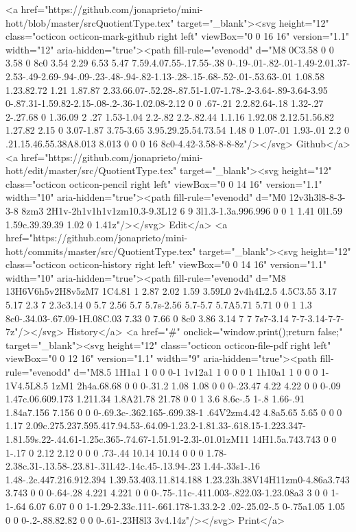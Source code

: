       <a href="https://github.com/jonaprieto/mini-hott/blob/master/srcQuotientType.tex" target="_blank"><svg height="12" class="octicon octicon-mark-github right left" viewBox="0 0 16 16" version="1.1" width="12" aria-hidden="true"><path fill-rule="evenodd" d="M8 0C3.58 0 0 3.58 0 8c0 3.54 2.29 6.53 5.47 7.59.4.07.55-.17.55-.38 0-.19-.01-.82-.01-1.49-2.01.37-2.53-.49-2.69-.94-.09-.23-.48-.94-.82-1.13-.28-.15-.68-.52-.01-.53.63-.01 1.08.58 1.23.82.72 1.21 1.87.87 2.33.66.07-.52.28-.87.51-1.07-1.78-.2-3.64-.89-3.64-3.95 0-.87.31-1.59.82-2.15-.08-.2-.36-1.02.08-2.12 0 0 .67-.21 2.2.82.64-.18 1.32-.27 2-.27.68 0 1.36.09 2 .27 1.53-1.04 2.2-.82 2.2-.82.44 1.1.16 1.92.08 2.12.51.56.82 1.27.82 2.15 0 3.07-1.87 3.75-3.65 3.95.29.25.54.73.54 1.48 0 1.07-.01 1.93-.01 2.2 0 .21.15.46.55.38A8.013 8.013 0 0 0 16 8c0-4.42-3.58-8-8-8z"/></svg> Github</a>
      <a href="https://github.com/jonaprieto/mini-hott/edit/master/src/QuotientType.tex" target="_blank"><svg height="12" class="octicon octicon-pencil right left" viewBox="0 0 14 16" version="1.1" width="10" aria-hidden="true"><path fill-rule="evenodd" d="M0 12v3h3l8-8-3-3-8 8zm3 2H1v-2h1v1h1v1zm10.3-9.3L12 6 9 3l1.3-1.3a.996.996 0 0 1 1.41 0l1.59 1.59c.39.39.39 1.02 0 1.41z"/></svg> Edit</a>
      <a href="https://github.com/jonaprieto/mini-hott/commits/master/src/QuotientType.tex" target="_blank"><svg height="12" class="octicon octicon-history right left" viewBox="0 0 14 16" version="1.1" width="10" aria-hidden="true"><path fill-rule="evenodd" d="M8 13H6V6h5v2H8v5zM7 1C4.81 1 2.87 2.02 1.59 3.59L0 2v4h4L2.5 4.5C3.55 3.17 5.17 2.3 7 2.3c3.14 0 5.7 2.56 5.7 5.7s-2.56 5.7-5.7 5.7A5.71 5.71 0 0 1 1.3 8c0-.34.03-.67.09-1H.08C.03 7.33 0 7.66 0 8c0 3.86 3.14 7 7 7s7-3.14 7-7-3.14-7-7-7z"/></svg> History</a>
      <a  href="#" onclick="window.print();return false;" target="_blank"><svg height="12" class="octicon octicon-file-pdf right left" viewBox="0 0 12 16" version="1.1" width="9" aria-hidden="true"><path fill-rule="evenodd" d="M8.5 1H1a1 1 0 0 0-1 1v12a1 1 0 0 0 1 1h10a1 1 0 0 0 1-1V4.5L8.5 1zM1 2h4a.68.68 0 0 0-.31.2 1.08 1.08 0 0 0-.23.47 4.22 4.22 0 0 0-.09 1.47c.06.609.173 1.211.34 1.8A21.78 21.78 0 0 1 3.6 8.6c-.5 1-.8 1.66-.91 1.84a7.156 7.156 0 0 0-.69.3c-.362.165-.699.38-1 .64V2zm4.42 4.8a5.65 5.65 0 0 0 1.17 2.09c.275.237.595.417.94.53-.64.09-1.23.2-1.81.33-.618.15-1.223.347-1.81.59s.22-.44.61-1.25c.365-.74.67-1.51.91-2.3l-.01.01zM11 14H1.5a.743.743 0 0 1-.17 0 2.12 2.12 0 0 0 .73-.44 10.14 10.14 0 0 0 1.78-2.38c.31-.13.58-.23.81-.31l.42-.14c.45-.13.94-.23 1.44-.33s1-.16 1.48-.2c.447.216.912.394 1.39.53.403.11.814.188 1.23.23h.38V14H11zm0-4.86a3.743 3.743 0 0 0-.64-.28 4.221 4.221 0 0 0-.75-.11c-.411.003-.822.03-1.23.08a3 3 0 0 1-1-.64 6.07 6.07 0 0 1-1.29-2.33c.111-.661.178-1.33.2-2 .02-.25.02-.5 0-.75a1.05 1.05 0 0 0-.2-.88.82.82 0 0 0-.61-.23H8l3 3v4.14z"/></svg> Print</a>

